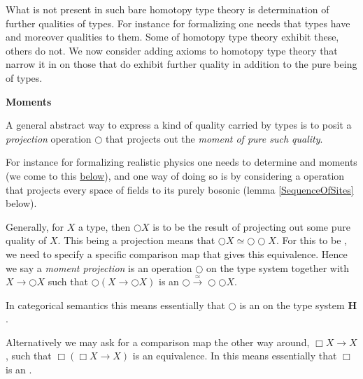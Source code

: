\documentclass[12pt,titlepage]{article}
\theoremstyle{plain}
\theoremstyle{definition}
\theoremstyle{remark}
\begin{document}
What is not present in such bare homotopy type theory is determination of further qualities of types. For instance for  formalizing  one needs that types have  and moreover  qualities to them. Some  of homotopy type theory exhibit these, others do not. We now consider adding axioms to homotopy type theory that narrow it in on those  that do exhibit further quality in addition to the pure being of types.

\textbf{Moments}

A general abstract way to express a kind of quality carried by types is to posit a \emph{projection} operation $\bigcirc$ that projects out the \emph{moment of pure such quality}.

For instance for formalizing realistic physics one needs to determine  and  moments (we come to this \hyperlink{Externalization}{below}), and one way of doing so is by considering a  operation that projects every space of fields to its purely bosonic  (lemma \ref{SequenceOfSites} below).

Generally, for $X$ a type, then $\bigcirc X$ is to be the result of projecting out some pure quality of $X$. This being a projection means that $\bigcirc X  \simeq \bigcirc \bigcirc X$. For this to be , we need to specify a specific comparison map that gives this equivalence. Hence we say a \emph{moment projection} is an operation $\bigcirc$ on the type system together with  $X \to \bigcirc X$ such that $\bigcirc(X \to \bigcirc X)$ is an  $\bigcirc \stackrel{\simeq}{\longrightarrow} \bigcirc \bigcirc X$.

In categorical semantics this means essentially that $\bigcirc$ is an  on the type system $\mathbf{H}$.

Alternatively we may ask for a comparison map the other way around, $\Box X \longrightarrow X$, such that $\Box(\Box X \longrightarrow X)$ is an equivalence. In  this means essentially that $\Box$ is an .
\end{document}
